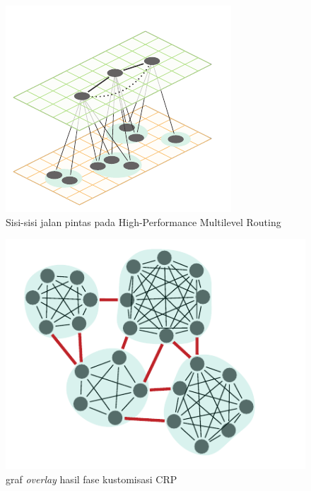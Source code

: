 \begin{figure}[H]
    \centering
    \includegraphics[]{figures/HPML.png}
    \caption{Sisi-sisi jalan pintas pada High-Performance Multilevel Routing}
    \label{fig:hpml}
\end{figure}


\begin{figure}[H]
    \centering
    \includegraphics[]{figures/CRP.png}
    \caption{graf \textit{overlay} hasil fase kustomisasi CRP}
    \label{fig:crp-overlay}
\end{figure}

